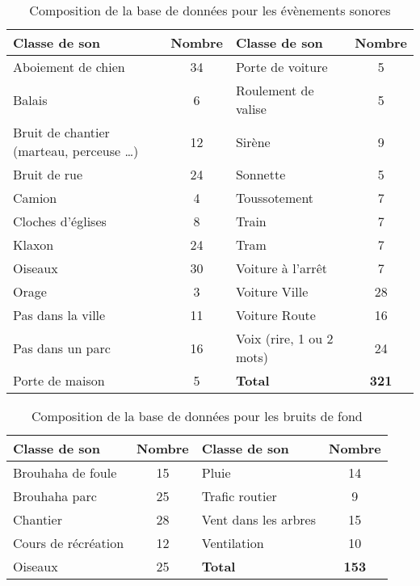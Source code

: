 \begin{table}[h]
\centering
\begin{tabular}{m{5cm} c |m{5cm} c}
\hline
\toprule
\textbf{Classe de son} & \textbf{Nombre} & \textbf{Classe de son} & \textbf{Nombre} \\
\midrule
Aboiement de chien & 34 & Porte de voiture & 5\\ 
Balais & 6 & Roulement de valise & 5 \\ 
Bruit de chantier (marteau, perceuse \dots) & 12 & Sirène & 9 \\ 
Bruit de rue & 24 & Sonnette & 5 \\ 
Camion & 4 & Toussotement & 7\\ 
Cloches d'églises & 8 & Train & 7 \\ 
Klaxon & 24 & Tram & 7 \\
Oiseaux & 30 & Voiture à l'arrêt & 7 \\ 
Orage & 3 & Voiture Ville & 28 \\ 
Pas dans la ville & 11 & Voiture Route & 16 \\ 
Pas dans un parc & 16 & Voix (rire, 1 ou 2 mots) & 24 \\
Porte de maison & 5 &  \textbf{Total} & \textbf{321}\\ 
\bottomrule
\end{tabular}
\caption{Composition de la base de données pour les évènements sonores}
\label{tab:dataBaseEv}
\end{table}

\begin{table}[h]
\centering
\begin{tabular}{m{5cm} c |m{5cm} c}
\toprule
\textbf{Classe de son} & \textbf{Nombre} & \textbf{Classe de son} & \textbf{Nombre} \\ \midrule
Brouhaha de foule & 15 & Pluie & 14 \\ 
Brouhaha parc & 25 & Trafic routier & 9 \\
Chantier & 28 & Vent dans les arbres & 15 \\ 
Cours de récréation & 12 & Ventilation & 10 \\ 
Oiseaux & 25 & \textbf{Total} & \textbf{153} \\ 
\bottomrule
\end{tabular}
\caption{Composition de la base de données pour les bruits de fond}
\label{tab:dataBaseBcg}
\end{table}
